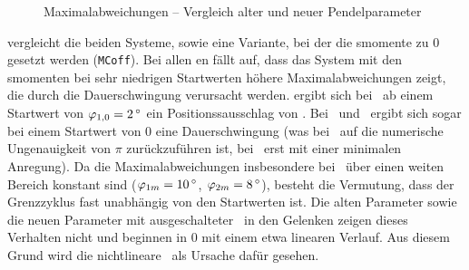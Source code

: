 \begin{figure}[htbp]
	\caption{Maximalabweichungen -- Vergleich alter und neuer Pendelparameter}
	\label{fig:vglpendelpar}
\end{figure}

 vergleicht die beiden Systeme, sowie eine Variante, bei der die \crb smomente zu 0 gesetzt werden (\texttt{MCoff}).
Bei allen \ap en fällt auf, dass das System mit den \crb smomenten bei sehr niedrigen Startwerten höhere Maximalabweichungen zeigt, die durch die Dauerschwingung verursacht werden.
\ZB ergibt sich bei \apz\ ab einem Startwert von $\pheo=\valdeg{2}$ ein Positionssausschlag von .
Bei \apd\ und \apv\ ergibt sich sogar bei einem Startwert von 0 eine Dauerschwingung (was bei \apd\ auf die numerische Ungenauigkeit von $\pi$ zurückzuführen ist, bei \apv\ erst mit einer minimalen Anregung).
Da die Maximalabweichungen insbesondere bei \apv\ über einen weiten Bereich konstant sind ($\phem=\valdeg{10}$, $\phzm=\valdeg{8}$), besteht die Vermutung, dass der Grenzzyklus fast unabhängig von den Startwerten ist.
Die alten Parameter sowie die neuen Parameter mit ausgeschalteter \crb\ in den Gelenken zeigen dieses Verhalten nicht und beginnen in 0 mit einem etwa linearen Verlauf.
Aus diesem Grund wird die nichtlineare \crb\ als Ursache dafür gesehen.


